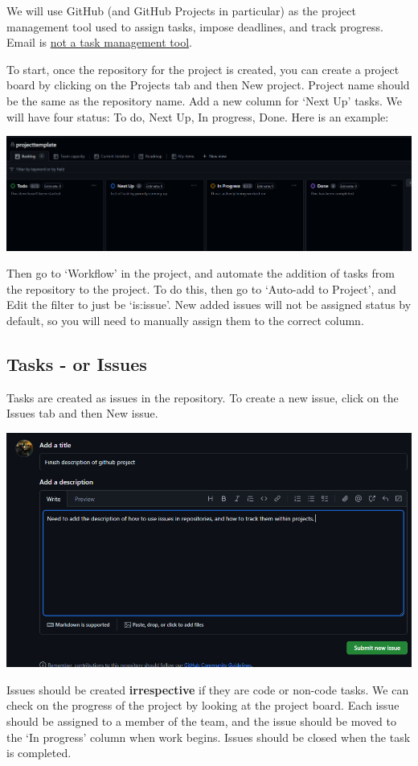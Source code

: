 We will use GitHub (and GitHub Projects in particular) as the project management tool used to assign tasks, impose deadlines, and track progress.
Email is \href{https://facilethings.com/blog/en/your-email-is-not-a-todo-list}{not a task management tool}.

To start, once the repository for the project is created, you can create a project board by clicking on the Projects tab and then New project.
Project name should be the same as the repository name. 
Add a new column for `Next Up' tasks.
We will have four status: To do, Next Up, In progress, Done.
Here is an example:
\begin{center}
    \includegraphics[width=.8\textwidth]{./figures/workflow/gitproject_example1.png}
\end{center}
Then go to `Workflow' in the project, and automate the addition of tasks from the repository to the project. 
To do this, then go to `Auto-add to Project', and Edit the filter to just be `is:issue'. 
New added issues will not be assigned status by default, so you will need to manually assign them to the correct column.

\subsection{Tasks - or Issues}
Tasks are created as issues in the repository.
To create a new issue, click on the Issues tab and then New issue.
\begin{center}
    \includegraphics[width=.8\textwidth]{./figures/workflow/gitproject_issue1.png}
\end{center}
Issues should be created \textbf{irrespective} if they are code or non-code tasks.
We can check on the progress of the project by looking at the project board.
Each issue should be assigned to a member of the team, and the issue should be moved to the `In progress' column when work begins.
Issues should be closed when the task is completed.

